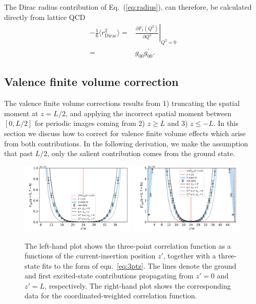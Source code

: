 \documentclass[prd,aps,twocolumn,superscriptaddress,tightenlines,nofootinbib,floatfix,preprintnumbers,10pt]{revtex4-1}
\begin{document}
The Dirac radius contribution of Eq.~(\ref{eq:radius}), can therefore, be calculated directly from lattice QCD
\begin{align}
 -\frac{1}{6}\langle r_{\mathrm{Dirac}}^2 \rangle =& \left. \frac{\partial F_1(Q^2)}{\partial
	Q^2}\right|_{Q^2=0}\nonumber \\
=&g_{00} g^\prime_{00}.
\end{align}

\subsection{Valence finite volume correction}
The valence finite volume corrections results from 1) truncating the spatial moment at $z=L/2$, and applying the incorrect spatial moment between $[0,L/2]$ for periodic images coming from 2) $z\geq L$ and 3) $z \leq -L$. In this section we discuss how to correct for valence finite volume effects which arise from both contributions. In the following derivation, we make the assumption that past $L/2$, only the salient contribution comes from the ground state.

\begin{figure}[t]{
		\includegraphics[width=0.49\textwidth]{figures/zcorr_3pt.pdf}
		\includegraphics[width=0.49\textwidth]{figures/zcorr_d3pt.pdf}
		\caption{The left-hand plot shows the three-point
                  correlation function as a functions of the
                  current-insertion position $z'$, together with a
                  three-state fits to the form of eqn.~\ref{eq:3ptz}.
                  The lines denote the ground and first excited-state
                  contributions propagating from $z' = 0$ and $z'=L$,
                  respectively.  The right-hand plot shows the
                  corresponding data for the coordinated-weighted
                  correlation function.}
		\label{fig:finite_volume}
}\end{figure}
\end{document}
